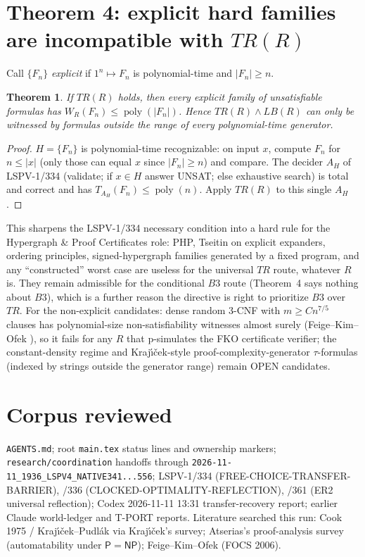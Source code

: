 \documentclass[11pt]{article}
\newtheorem{theorem}{Theorem}
\newcommand{\poly}{\operatorname{poly}}
\begin{document}
\section{Theorem 4: explicit hard families are incompatible with $TR(R)$}
Call $\{F_n\}$ \emph{explicit} if $1^n\mapsto F_n$ is polynomial-time and
$|F_n|\ge n$.
\begin{theorem}
If $TR(R)$ holds, then every explicit family of unsatisfiable formulas
has $W_R(F_n)\le\poly(|F_n|)$. Hence $TR(R)\wedge LB(R)$ can only be
witnessed by formulas outside the range of every polynomial-time generator.
\end{theorem}
\begin{proof}
$H=\{F_n\}$ is polynomial-time recognizable: on input $x$, compute $F_n$
for $n\le|x|$ (only those can equal $x$ since $|F_n|\ge n$) and compare.
The decider $A_H$ of LSPV-1/334 (validate; if $x\in H$ answer UNSAT; else
exhaustive search) is total and correct and has $T_{A_H}(F_n)\le\poly(n)$.
Apply $TR(R)$ to this single $A_H$.
\end{proof}
\noindent This sharpens the LSPV-1/334 necessary condition into a hard
rule for the Hypergraph \& Proof Certificates role: PHP, Tseitin on
explicit expanders, ordering principles, signed-hypergraph families
generated by a fixed program, and any ``constructed'' worst case are
useless for the universal $TR$ route, whatever $R$ is. They remain
admissible for the conditional $B3$ route (Theorem~4 says nothing about
$B3$), which is a further reason the directive is right to prioritize $B3$
over $TR$. For the non-explicit candidates: dense random 3-CNF with
$m\ge Cn^{7/5}$ clauses has polynomial-size non-satisfiability witnesses
almost surely (Feige--Kim--Ofek \cite{fko}), so it fails for any $R$ that
p-simulates the FKO certificate verifier; the constant-density regime and
Kraj\'{\i}\v{c}ek-style proof-complexity-generator $\tau$-formulas (indexed by
strings outside the generator range) remain OPEN candidates.

\section{Corpus reviewed}
\texttt{AGENTS.md}; root \texttt{main.tex} status lines and ownership markers;
\texttt{research/coordination} handoffs through
\texttt{2026-11-11\_1936\_LSPV4\_NATIVE341...556}; LSPV-1/334
(FREE-CHOICE-TRANSFER-BARRIER), /336 (CLOCKED-OPTIMALITY-REFLECTION), /361
(ER2 universal reflection); Codex 2026-11-11 13:31 transfer-recovery report;
earlier Claude world-ledger and T-PORT reports. Literature searched this run:
Cook 1975 / Kraj\'{\i}\v{c}ek--Pudl\'ak via Kraj\'{\i}\v{c}ek's survey; Atserias's
proof-analysis survey (automatability under $\mathsf P=\mathsf{NP}$);
Feige--Kim--Ofek (FOCS 2006).
\end{document}
